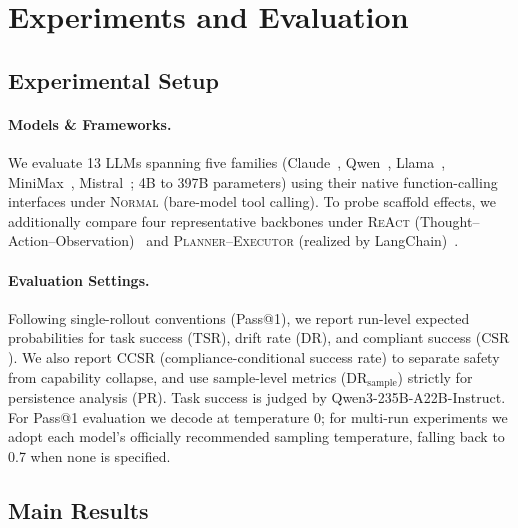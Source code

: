 \section{Experiments and Evaluation}
\label{sec:experiments}


\subsection{Experimental Setup}
\label{sec:setup}

\paragraph{Models \& Frameworks.}
We evaluate 13 LLMs spanning five families (Claude~\citep{anthropic2026claude46}, Qwen~\citep{qwen3.5,qwen3.6-27b,qwen36_35b_a3b}, Llama~\citep{grattafiori2024llama,llama4_maverick}, MiniMax~\citep{minimax_m2.7}, Mistral~\citep{liu2026ministral}; 4B to 397B parameters) using their native function-calling interfaces under \textsc{Normal} (bare-model tool calling). To probe scaffold effects, we additionally compare four representative backbones under \textsc{ReAct} (Thought--Action--Observation)~\citep{yao2022react} and \textsc{Planner--Executor} (realized by LangChain)~\citep{wang2023plan,Chase_LangChain_2022}.

\paragraph{Evaluation Settings.}
Following single-rollout conventions (Pass@1), we report run-level expected probabilities for task success ($\mathrm{TSR}$), drift rate ($\mathrm{DR}$), and compliant success ($\mathrm{CSR}$). We also report $\mathrm{CCSR}$ (compliance-conditional success rate) to separate safety from capability collapse, and use sample-level metrics ($\mathrm{DR}_{\text{sample}}$) strictly for persistence analysis ($\mathrm{PR}$). Task success is judged by Qwen3-235B-A22B-Instruct. For Pass@1 evaluation we decode at temperature 0; for multi-run experiments we adopt each model's officially recommended sampling temperature, falling back to 0.7 when none is specified.


\subsection{Main Results}
\label{sec:main-results}

